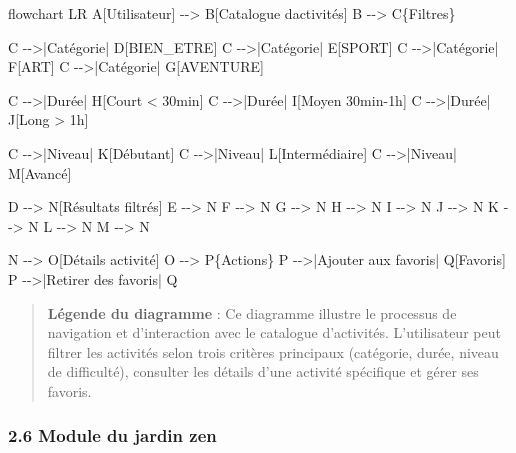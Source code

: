 \documentclass[
]{article}
\newenvironment{Shaded}{}{}
\newcommand{\NormalTok}[1]{#1}
\begin{document}
\begin{Shaded}
\begin{Highlighting}[]
\NormalTok{flowchart LR}
\NormalTok{    A[Utilisateur] {-}{-}\textgreater{} B[Catalogue d\textquotesingle{}activités]}
\NormalTok{    B {-}{-}\textgreater{} C\{Filtres\}}
    
\NormalTok{    C {-}{-}\textgreater{}|Catégorie| D[BIEN\_ETRE]}
\NormalTok{    C {-}{-}\textgreater{}|Catégorie| E[SPORT]}
\NormalTok{    C {-}{-}\textgreater{}|Catégorie| F[ART]}
\NormalTok{    C {-}{-}\textgreater{}|Catégorie| G[AVENTURE]}
    
\NormalTok{    C {-}{-}\textgreater{}|Durée| H[Court \textless{} 30min]}
\NormalTok{    C {-}{-}\textgreater{}|Durée| I[Moyen 30min{-}1h]}
\NormalTok{    C {-}{-}\textgreater{}|Durée| J[Long \textgreater{} 1h]}
    
\NormalTok{    C {-}{-}\textgreater{}|Niveau| K[Débutant]}
\NormalTok{    C {-}{-}\textgreater{}|Niveau| L[Intermédiaire]}
\NormalTok{    C {-}{-}\textgreater{}|Niveau| M[Avancé]}
    
\NormalTok{    D {-}{-}\textgreater{} N[Résultats filtrés]}
\NormalTok{    E {-}{-}\textgreater{} N}
\NormalTok{    F {-}{-}\textgreater{} N}
\NormalTok{    G {-}{-}\textgreater{} N}
\NormalTok{    H {-}{-}\textgreater{} N}
\NormalTok{    I {-}{-}\textgreater{} N}
\NormalTok{    J {-}{-}\textgreater{} N}
\NormalTok{    K {-}{-}\textgreater{} N}
\NormalTok{    L {-}{-}\textgreater{} N}
\NormalTok{    M {-}{-}\textgreater{} N}
    
\NormalTok{    N {-}{-}\textgreater{} O[Détails activité]}
\NormalTok{    O {-}{-}\textgreater{} P\{Actions\}}
\NormalTok{    P {-}{-}\textgreater{}|Ajouter aux favoris| Q[Favoris]}
\NormalTok{    P {-}{-}\textgreater{}|Retirer des favoris| Q}
\end{Highlighting}
\end{Shaded}

\begin{quote}
\textbf{Légende du diagramme} : Ce diagramme illustre le processus de
navigation et d’interaction avec le catalogue d’activités. L’utilisateur
peut filtrer les activités selon trois critères principaux (catégorie,
durée, niveau de difficulté), consulter les détails d’une activité
spécifique et gérer ses favoris.
\end{quote}

\subsubsection{2.6 Module du jardin zen}\label{module-du-jardin-zen}
\end{document}
